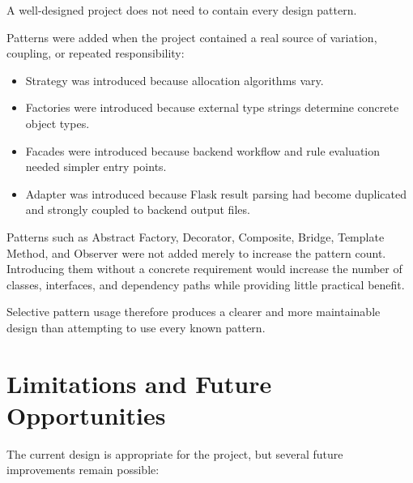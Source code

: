 \documentclass[12pt,a4paper]{article}
\begin{document}
A well-designed project does not need to contain every design pattern.

Patterns were added when the project contained a real source of variation,
coupling, or repeated responsibility:

\begin{itemize}
    \item Strategy was introduced because allocation algorithms vary.
    \item Factories were introduced because external type strings determine
    concrete object types.
    \item Facades were introduced because backend workflow and rule evaluation
    needed simpler entry points.
    \item Adapter was introduced because Flask result parsing had become
    duplicated and strongly coupled to backend output files.
\end{itemize}

Patterns such as Abstract Factory, Decorator, Composite, Bridge, Template
Method, and Observer were not added merely to increase the pattern count.
Introducing them without a concrete requirement would increase the number of
classes, interfaces, and dependency paths while providing little practical
benefit.

Selective pattern usage therefore produces a clearer and more maintainable
design than attempting to use every known pattern.

\section{Limitations and Future Opportunities}

The current design is appropriate for the project, but several future
improvements remain possible:
\end{document}
